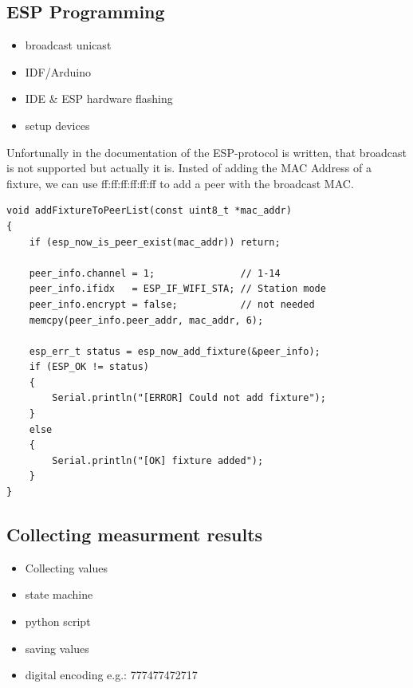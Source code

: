 \subsection{ESP Programming}
\begin{itemize}
	\item broadcast unicast
	\item IDF/Arduino
	\item IDE \& ESP hardware flashing
	\item setup devices
\end{itemize}


Unfortunally in the documentation of the ESP-protocol is written, that broadcast is not supported 
but actually it is. Insted of adding the \ac{MAC} Address of a fixture, we can use 
 ff:ff:ff:ff:ff:ff 
to add a peer with the broadcast \ac{MAC}.

\label{lst:shorttable}
\begin{lstlisting}
void addFixtureToPeerList(const uint8_t *mac_addr) 
{
	if (esp_now_is_peer_exist(mac_addr)) return;

	peer_info.channel = 1;               // 1-14
	peer_info.ifidx   = ESP_IF_WIFI_STA; // Station mode
	peer_info.encrypt = false;         	 // not needed
	memcpy(peer_info.peer_addr, mac_addr, 6);

	esp_err_t status = esp_now_add_fixture(&peer_info);
	if (ESP_OK != status) 
	{
		Serial.println("[ERROR] Could not add fixture");
	}
	else 
	{
		Serial.println("[OK] fixture added");
	}
}
\end{lstlisting}
% 


\subsection{Collecting measurment results}
\begin{itemize}
\item Collecting values
\item state machine
\item python script
\item saving values
\item digital encoding e.g.: 777477472717
\end{itemize}

